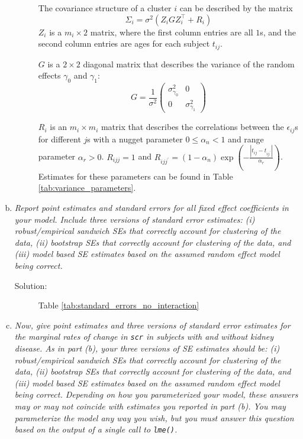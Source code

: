 \documentclass[11pt, letterpaper]{article}
\begin{document}
\begin{enumerate}[(a)]
\begin{description}
  The covariance structure of a cluster $i$ can be described by the matrix
  \begin{equation}
    \Sigma_i = \sigma^2\left(Z_iGZ_i^\intercal + R_i\right)
    \label{eqn:cluster_covariance}
  \end{equation}
  $Z_i$ is a $m_i \times 2$ matrix, where the first column entries are all $1$s,
  and the second column entries are ages for each subject $t_{ij}$.

  $G$ is a $2 \times 2$ diagonal matrix that describes the variance of the
  random effects $\gamma_0$ and $\gamma_1$:
  \begin{equation}
    G = \frac{1}{\sigma^2}\begin{pmatrix}
      \sigma^2_{\gamma_0} & 0 \\
      0 & \sigma^2_{\gamma_1}
    \end{pmatrix}
    \label{eqn:random_effects_covariance}
  \end{equation}

  $R_i$ is an $m_i \times m_i$ matrix that describes the correlations between
  the $\epsilon_{ij}$s for different $j$s with a nugget parameter
  $0 \leq \alpha_n < 1$ and range parameter $\alpha_r > 0$. $R_{ijj} = 1$ and
  $R_{ijj^\prime} = \left(1 - \alpha_n\right) \exp\left(-\frac{\left\lvert
        t_{ij} - t_{ij^\prime}\right\rvert}{\alpha_r}\right)$. Estimates for
  these parameters can be found in Table \ref{tab:variance_parameters}.
\end{description}

\item {\em  Report point estimates and standard errors for all fixed effect
coefficients in your model.  Include three versions of standard error estimates: (i) robust/empirical sandwich SEs that correctly
account for clustering of the data, (ii) bootstrap SEs that correctly account for clustering of the data, and (iii) model based SE estimates based on the assumed random effect model being correct.}



\begin{description}
\item[Solution:] Table \ref{tab:standard_errors_no_interaction}
\end{description}

\item {\em  Now, give point estimates and three versions of standard error estimates for the marginal rates of change in \texttt{scr} in subjects with and without 
kidney disease.  As in part (b), your three versions of SE estimates should be:  (i) robust/empirical sandwich SEs that correctly
account for clustering of the data, (ii) bootstrap SEs that correctly account for clustering of the data, and (iii) model based SE estimates based on the assumed random effect model being correct.  Depending on how you parameterized your model, these answers may or may not 
coincide with estimates you reported in part (b).  You may parameterize the model any way you wish,
but you must answer this question based on the output of a single call to \texttt{lme()}.}


\end{enumerate}
\end{document}
